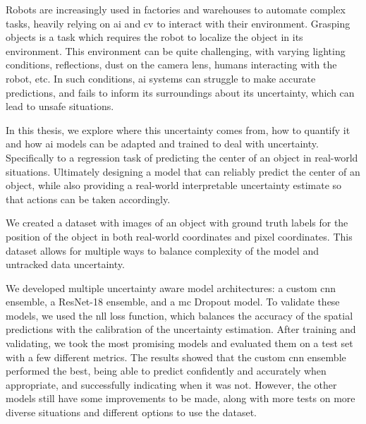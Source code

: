 Robots are increasingly used in factories and warehouses to automate complex tasks, heavily relying on \gls{ai} and \gls{cv} to interact with their environment.
Grasping objects is a task which requires the robot to localize the object in its environment.
This environment can be quite challenging, with varying lighting conditions, reflections, dust on the camera lens, humans interacting with the robot, etc.
In such conditions, \gls{ai} systems can struggle to make accurate predictions, and fails to inform its surroundings about its uncertainty, which can lead to unsafe situations.

In this thesis, we explore where this uncertainty comes from, how to quantify it and how \gls{ai} models can be adapted and trained to deal with uncertainty.
Specifically to a regression task of predicting the center of an object in real-world situations.
Ultimately designing a model that can reliably predict the center of an object, while also providing a real-world interpretable uncertainty estimate so that actions can be taken accordingly.

We created a dataset with images of an object with ground truth labels for the position of the object in both real-world coordinates and pixel coordinates.
This dataset allows for multiple ways to balance complexity of the model and untracked data uncertainty.

We developed multiple uncertainty aware model architectures: a custom \gls{cnn} ensemble, a ResNet-18 ensemble, and a \gls{mc} Dropout model.
To validate these models, we used the \gls{nll} loss function, which balances the accuracy of the spatial predictions with the calibration of the uncertainty estimation.
After training and validating, we took the most promising models and evaluated them on a test set with a few different metrics.
The results showed that the custom \gls{cnn} ensemble performed the best, being able to predict confidently and accurately when appropriate, and successfully indicating when it was not.
However, the other models still have some improvements to be made, along with more tests on more diverse situations and different options to use the dataset.
